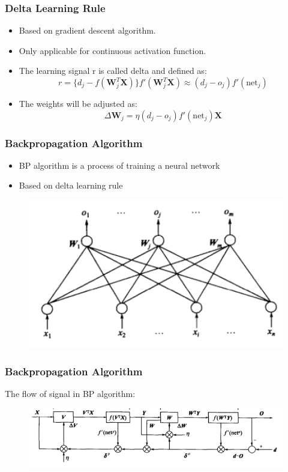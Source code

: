 \documentclass{beamer}
\begin{document}
\begin{frame}
	\frametitle{Delta Learning Rule}
\begin{itemize}
	\item Based on gradient descent algorithm.
	\item Only applicable for continuous activation function.
	\item The learning signal r is called delta and defined as:
	\begin{equation*}
	r = \{d_{j} - f(\bm{W}_{j}^{T}\bm{X})\}f'(\bm{W}_{j}^{T}\bm{X}) \approx (d_{j}-o_{j})f'(\text{net}_{j})
	\end{equation*}
	\item The weights will be adjusted as:
	\begin{equation*}
	\Delta \bm{W}_{j} = \eta(d_{j} - o_{j})f'(\text{net}_{j})\bm{X}
	\end{equation*}
	
\end{itemize}
\end{frame}

\begin{frame}
	\frametitle{Backpropagation Algorithm}
	\begin{itemize}
		\item BP algorithm is a process of training a neural network
		\item Based on delta learning rule
	\end{itemize}
	\begin{figure}
		\includegraphics[width=0.8\linewidth]{singlelayer_network.png}
	\end{figure}
\end{frame}

\begin{frame}
	\frametitle{Backpropagation Algorithm}
	The flow of signal in BP algorithm:
	\begin{figure}
		\includegraphics[width=\linewidth]{bp_flow.png}
	\end{figure}
\end{frame}
\end{document}

